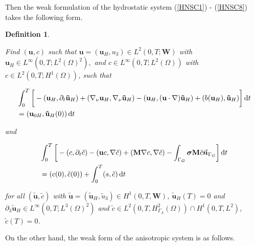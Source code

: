 \documentclass[11pt]{article}
\newtheorem{definition}{Definition}
\newcommand*\diff{\mathop{}\!\mathrm{d}}
\begin{document}
Then the weak formulation of the hydrostatic system (\ref{HNSC1}) - (\ref{HNSC8}) takes the following form.
  
  \begin{definition} \label{definitionhydrostaticWF}
  
Find $(\mathbf{u}, c)$ such that $\mathbf{u} = (\mathbf{u}_H, u_3) \in L^2 (0, T; \mathbf{W})$ with $\mathbf{u}_H \in L^\infty (0,T; L^2(\Omega)^2),$ and $c \in L^\infty(0,T; L^2(\Omega))$ with $c \in L^2(0,T; H^1(\Omega))$, such that
  
  \begin{equation}
    \begin{split}
      & \int_0^T \bigg[ -(\mathbf{u}_H, \partial_t \mathbf{\tilde{u}}_H) + (\nabla_\nu \mathbf{u}_H, \nabla_\nu \mathbf{\tilde{u}}_H) - (\mathbf{u}_H, (\mathbf{u} \cdot \nabla) \mathbf{\tilde{u}}_H) + (b(\mathbf{u}_H), \mathbf{\tilde{u}}_H) \bigg ] \diff t \\
      & = (\mathbf{u}_{0H}, \mathbf{\tilde{u}}_H(0)) \diff t \raisetag{15pt}\label{hydrostaticWF_U}
    \end{split}
  \end{equation}
  
  and
  
    \begin{equation}
    \begin{split}
      & \int_0^T \bigg[ - (c, \partial_t \tilde{c}) -(\mathbf{u}c, \nabla \tilde{c}) +  (\mathbf{M} \nabla c, \nabla \tilde{c}) - \int_{\Gamma_G} \boldsymbol{\sigma} \mathbf{M} \tilde{c} \vec{\boldsymbol{n}}_{\Gamma_G} \bigg ] \diff t \\
      & = (c(0), \tilde{c}(0)) + \int_0^T (s,\tilde{c}) \diff t \raisetag{20pt} \label{hydrostaticWF_C}
    \end{split}
  \end{equation}
  
  for all $(\mathbf{\tilde{u}}, \tilde{c})$ with $\mathbf{\tilde{u}} = (\mathbf{\tilde{u}}_H, \tilde{u}_3) \in H^1 (0,T, \mathbf{W})$, $\mathbf{\tilde{u}}_H (T) = 0$ and $\partial_3 \mathbf{\tilde{u}}_H \in L^\infty (0, T; L^3 (\Omega)^2)$ and  $\tilde{c} \in L^2 (0,T, H^2_{\Gamma_A} (\Omega)) \cap H^1 (0,T, L^2)$, $\tilde{c} (T) = 0$. 
  
  \end{definition}
  
On the other hand, the weak form of the anisotropic system is as follows.
  
\end{document}
